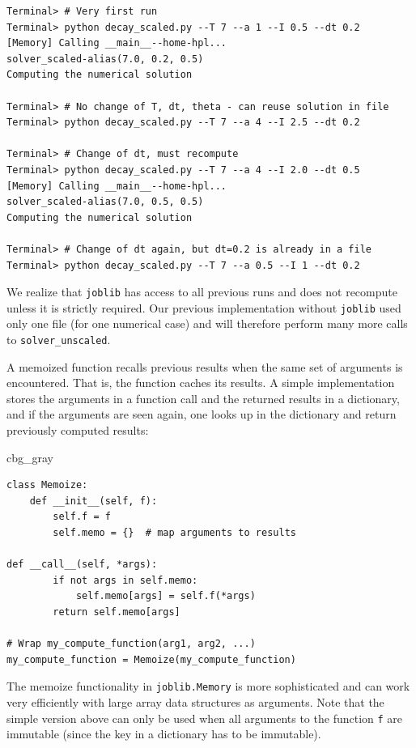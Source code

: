 \documentclass[graybox,envcountchap,sectrefs,final]{svmonodo}
\newenvironment{_cod_tight}[1]{
   \def\FrameCommand{\colorbox{#1}}
   \FrameRule0.6pt\MakeFramed {\FrameRestore}\vskip3mm}
   {\vskip0mm\endMakeFramed}
\newenvironment{cod}[1]{
\bgroup\rmfamily
\fboxsep=0mm\relax
\begin{_cod_tight}{#1}
\list{}{\parsep=-2mm\parskip=0mm\topsep=0pt\leftmargin=2mm
\rightmargin=2\leftmargin\leftmargin=4pt\relax}
\item\relax}
{\endlist\end{_cod_tight}\egroup}
\newenvironment{notice_mdfboxadmon}[1][]{
\begin{notice_mdfboxmdframed}[frametitle=#1]
}
{
\end{notice_mdfboxmdframed}
}
\begin{document}
\begin{Verbatim}[frame=lines,label=\fbox{{\tiny Terminal}},framesep=2.5mm,framerule=0.7pt,fontsize=\fontsize{9pt}{9pt}]
Terminal> # Very first run
Terminal> python decay_scaled.py --T 7 --a 1 --I 0.5 --dt 0.2
[Memory] Calling __main__--home-hpl...
solver_scaled-alias(7.0, 0.2, 0.5)
Computing the numerical solution

Terminal> # No change of T, dt, theta - can reuse solution in file
Terminal> python decay_scaled.py --T 7 --a 4 --I 2.5 --dt 0.2

Terminal> # Change of dt, must recompute
Terminal> python decay_scaled.py --T 7 --a 4 --I 2.0 --dt 0.5
[Memory] Calling __main__--home-hpl...
solver_scaled-alias(7.0, 0.5, 0.5)
Computing the numerical solution

Terminal> # Change of dt again, but dt=0.2 is already in a file
Terminal> python decay_scaled.py --T 7 --a 0.5 --I 1 --dt 0.2
\end{Verbatim}

We realize that \texttt{joblib} has access to all previous runs and does not
recompute unless it is strictly required. Our previous implementation
without \texttt{joblib}
used only one file (for one numerical case)
and will therefore perform many more calls to
\Verb!solver_unscaled!.


\begin{notice_mdfboxadmon}
A memoized function recalls
previous results when the same set
of arguments is encountered. That is, the function caches its results.
A simple implementation stores the arguments in a function call and
the returned results in a
dictionary, and if the arguments are seen again, one looks up
in the dictionary and return previously computed results:

\begin{cod}{cbg_gray}\begin{Verbatim}[numbers=none,fontsize=\fontsize{9pt}{9pt},baselinestretch=0.95,xleftmargin=2mm]
class Memoize:
    def __init__(self, f):
        self.f = f
        self.memo = {}  # map arguments to results

def __call__(self, *args):
        if not args in self.memo:
            self.memo[args] = self.f(*args)
        return self.memo[args]

# Wrap my_compute_function(arg1, arg2, ...)
my_compute_function = Memoize(my_compute_function)
\end{Verbatim}
\end{cod}
\noindent
The memoize functionality in \texttt{joblib.Memory} is more sophisticated and
can work very efficiently with large array data structures as arguments.
Note that the simple version above can only be used when all arguments to
the function \texttt{f} are immutable (since the key in a dictionary has to be
immutable).
\end{notice_mdfboxadmon}
\end{document}
